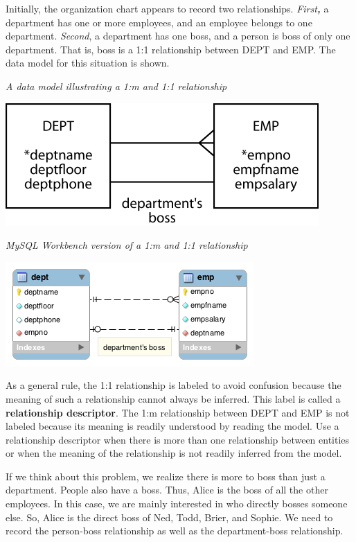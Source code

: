 \documentclass[
]{article}
\begin{document}
Initially, the organization chart appears to record two relationships.
\emph{First\textbf{,}} a department has one or more employees, and an employee
belongs to one department. \emph{Second}, a department has one boss, and a
person is boss of only one department. That is, boss is a 1:1
relationship between DEPT and EMP. The data model for this situation is
shown.

\emph{A data model illustrating a 1:m and 1:1 relationship}

\includegraphics[width=4.70833in,height=\textheight]{Figures/Chapter 6/1-and-1.png}

\emph{MySQL Workbench version of a 1:m and 1:1 relationship}

\includegraphics{Figures/Chapter 6/1-1-wb.png}

As a general rule, the 1:1 relationship is labeled to avoid confusion
because the meaning of such a relationship cannot always be inferred.
This label is called a \textbf{relationship descriptor}. The 1:m relationship
between DEPT and EMP is not labeled because its meaning is readily
understood by reading the model. Use a relationship descriptor when
there is more than one relationship between entities or when the meaning
of the relationship is not readily inferred from the model.

If we think about this problem, we realize there is more to boss than
just a department. People also have a boss. Thus, Alice is the boss of
all the other employees. In this case, we are mainly interested in who
directly bosses someone else. So, Alice is the direct boss of Ned, Todd,
Brier, and Sophie. We need to record the person-boss relationship as
well as the department-boss relationship.
\end{document}
